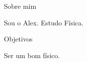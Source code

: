 \documentclass[11pt, a4paper]{awesome-cv} %
\begin{document}
 
 
\makecvheader %
 
 
 
 
 
 
\begin{cventries} 
 
 
\cventry 
{} %
{Sobre mim} %
{} %
{} %
{ %
\begin{cvitems} 
\item {Sou o Alex.
Estudo Física.} 
\end{cvitems} 
} 
 
 
\end{cventries}           
 
 
 
 
 
\begin{cventries} 
 
 
\cventry 
{} %
{Objetivos} %
{} %
{} %
{ %
\begin{cvitems} 
\item {Ser um bom físico.} 
\end{cvitems} 
} 
 
 
\end{cventries}           
 
\end{document}
